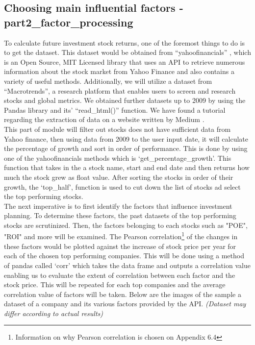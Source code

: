 \documentclass[fontsize=11pt]{article}
\begin{document}
\subsection{Choosing main influential factors - part2\_factor\_processing}
To calculate future investment stock returns, one of the foremost things to do is to get the dataset. This dataset would be obtained from “yahoofinancials” \cite{jecsandyahoo}, which is an Open Source, MIT Licensed library that uses an API to retrieve numerous information about the stock market from Yahoo Finance \cite{yahoofinancials}and also contains a variety of useful methods. Additionally, we will utilize a dataset from “Macrotrends”\cite{macrotrends}, a research platform that enables users to screen and research stocks and global metrics. We obtained further datasets up to 2009 by using the Pandas library\cite{pandas} and its’ “read\_html()” function. We have found a tutorial regarding the extraction of data on a website written by Medium \cite{tballz2022retrieving}.\\

This part of module will filter out stocks does not have sufficient data from Yahoo finance, then using data from 2009 to the user input date, it will calculate the percentage of growth and sort in order of performance. This is done by using one of the yahoofinancials methods which is `get\_percentage\_growth'. This function  that takes in the a stock name, start and end date and then returns how much the stock grew as float value. After sorting the stocks in order of their growth, the `top\_half', function is used to cut down the list of stocks ad select the top performing stocks.\\

The next imperative is to first identify the factors that influence investment planning. To determine these factors, the past datasets of the top performing stocks are scrutinized. Then, the factors belonging to each stocks such as "POE", "ROI" and more will be examined. The Pearson correlation\footnote{Information on why Pearson correlation is chosen on Appendix 6.4} of the changes in these factors would be plotted against the increase of stock price per year for each of the chosen top performing companies. This will be done using a method of pandas\cite{pandascorr} called `corr' which takes the data frame and outputs a correlation value enabling us to evaluate the extent of correlation between each factor and the stock price.
This will be repeated for each top companies and the average correlation value of factors will be taken. Below are the images of the sample a dataset of a company and its various factors provided by the API. \textit{(Dataset may differ according to actual results)} \\
\end{document}
